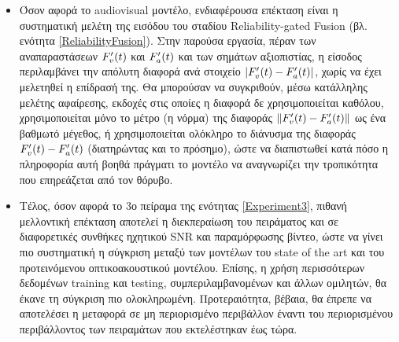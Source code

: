 \begin{itemize}
\item Όσον αφορά το audiovisual μοντέλο, ενδιαφέρουσα επέκταση είναι η συστηματική μελέτη της εισόδου του σταδίου Reliability-gated Fusion (βλ. ενότητα \ref{ReliabilityFusion}). Στην παρούσα εργασία, πέραν των αναπαραστάσεων $F_v\sp{\prime}(t)$ και $F_a\sp{\prime}(t)$ και των σημάτων αξιοπιστίας, η είσοδος περιλαμβάνει την απόλυτη διαφορά ανά στοιχείο $\lvert F_v\sp{\prime}(t) - F_a\sp{\prime}(t) \rvert$, χωρίς να έχει μελετηθεί η επίδρασή της. Θα μπορούσαν να συγκριθούν, μέσω κατάλληλης μελέτης αφαίρεσης, εκδοχές στις οποίες η διαφορά δε χρησιμοποιείται καθόλου, χρησιμοποιείται μόνο το μέτρο (η νόρμα) της διαφοράς $\lVert F_v\sp{\prime}(t) - F_a\sp{\prime}(t) \rVert$ ως ένα βαθμωτό μέγεθος, ή χρησιμοποιείται ολόκληρο το διάνυσμα της διαφοράς $F_v\sp{\prime}(t) - F_a\sp{\prime}(t)$ (διατηρώντας και το πρόσημο), ώστε να διαπιστωθεί κατά πόσο η πληροφορία αυτή βοηθά πράγματι το μοντέλο να αναγνωρίζει την τροπικότητα που επηρεάζεται από τον θόρυβο.

\item Τέλος, όσον αφορά το 3ο πείραμα της ενότητας \ref{Experiment3}, πιθανή μελλοντική επέκταση αποτελεί η διεκπεραίωση του πειράματος και σε διαφορετικές συνθήκες ηχητικού SNR και παραμόρφωσης βίντεο, ώστε να γίνει πιο συστηματική η σύγκριση μεταξύ των μοντέλων του state of the art και του προτεινόμενου οπτικοακουστικού μοντέλου. Επίσης, η χρήση περισσότερων δεδομένων training και testing, συμπεριλαμβανομένων και άλλων ομιλητών, θα έκανε τη σύγκριση πιο ολοκληρωμένη. Προτεραιότητα, βέβαια, θα έπρεπε να αποτελέσει η μεταφορά σε μη περιορισμένο περιβάλλον έναντι του περιορισμένου περιβάλλοντος των πειραμάτων που εκτελέστηκαν έως τώρα.

\end{itemize}